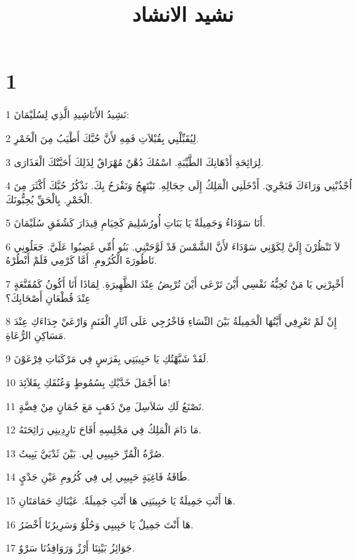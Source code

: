 

\title{نشيد الانشاد}


\chapter{1}

\par 1 نَشِيدُ الأَنَاشِيدِ الَّذِي لِسُلَيْمَانَ:
\par 2 لِيُقَبِّلْنِي بِقُبْلاَتِ فَمِهِ لأَنَّ حُبَّكَ أَطْيَبُ مِنَ الْخَمْرِ.
\par 3 لِرَائِحَةِ أَدْهَانِكَ الطَّيِّبَةِ. اسْمُكَ دُهْنٌ مُهْرَاقٌ لِذَلِكَ أَحَبَّتْكَ الْعَذَارَى.
\par 4 اُجْذُبْنِي وَرَاءَكَ فَنَجْرِيَ. أَدْخَلَنِي الْمَلِكُ إِلَى حِجَالِهِ. نَبْتَهِجُ وَنَفْرَحُ بِكَ. نَذْكُرُ حُبَّكَ أَكْثَرَ مِنَ الْخَمْرِ. بِالْحَقِّ يُحِبُّونَكَ.
\par 5 أَنَا سَوْدَاءُ وَجَمِيلَةٌ يَا بَنَاتِ أُورُشَلِيمَ كَخِيَامِ قِيدَارَ كَشُقَقِ سُلَيْمَانَ.
\par 6 لاَ تَنْظُرْنَ إِلَيَّ لِكَوْنِي سَوْدَاءَ لأَنَّ الشَّمْسَ قَدْ لَوَّحَتْنِي. بَنُو أُمِّي غَضِبُوا عَلَيَّ. جَعَلُونِي نَاطُورَةَ الْكُرُومِ. أَمَّا كَرْمِي فَلَمْ أَنْطُرْهُ.
\par 7 أَخْبِرْنِي يَا مَنْ تُحِبُّهُ نَفْسِي أَيْنَ تَرْعَى أَيْنَ تُرْبِضُ عِنْدَ الظَّهِيرَةِ. لِمَاذَا أَنَا أَكُونُ كَمُقَنَّعَةٍ عِنْدَ قُطْعَانِ أَصْحَابِكَ؟
\par 8 إِنْ لَمْ تَعْرِفِي أَيَّتُهَا الْجَمِيلَةُ بَيْنَ النِّسَاءِ فَاخْرُجِي عَلَى آثَارِ الْغَنَمِ وَارْعَيْ جِدَاءَكِ عِنْدَ مَسَاكِنِ الرُّعَاةِ.
\par 9 لَقَدْ شَبَّهْتُكِ يَا حَبِيبَتِي بِفَرَسٍ فِي مَرْكَبَاتِ فِرْعَوْنَ.
\par 10 مَا أَجْمَلَ خَدَّيْكِ بِسُمُوطٍ وَعُنُقَكِ بِقَلاَئِدَ!
\par 11 نَصْنَعُ لَكِ سَلاَسِلَ مِنْ ذَهَبٍ مَعَ جُمَانٍ مِنْ فِضَّةٍ.
\par 12 مَا دَامَ الْمَلِكُ فِي مَجْلِسِهِ أَفَاحَ نَارِدِينِي رَائِحَتَهُ.
\par 13 صُرَّةُ الْمُرِّ حَبِيبِي لِي. بَيْنَ ثَدْيَيَّ يَبِيتُ.
\par 14 طَاقَةُ فَاغِيَةٍ حَبِيبِي لِي فِي كُرُومِ عَيْنِ جَدْيٍ.
\par 15 هَا أَنْتِ جَمِيلَةٌ يَا حَبِيبَتِي هَا أَنْتِ جَمِيلَةٌ. عَيْنَاكِ حَمَامَتَانِ.
\par 16 هَا أَنْتَ جَمِيلٌ يَا حَبِيبِي وَحُلْوٌ وَسَرِيرُنَا أَخْضَرُ.
\par 17 جَوَائِزُ بَيْتِنَا أَرْزٌ وَرَوَافِدُنَا سَرْوٌ.

